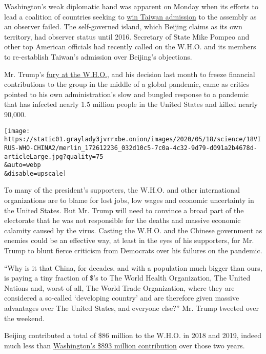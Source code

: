 Washington's weak diplomatic hand was apparent on Monday when its
efforts to lead a coalition of countries seeking to
\href{https://www.nytimes3xbfgragh.onion/aponline/2020/05/18/world/asia/ap-as-taiwan-world-health-assembly.html}{win
Taiwan admission} to the assembly as an observer failed. The
self-governed island, which Beijing claims as its own territory, had
observer status until 2016. Secretary of State Mike Pompeo and other top
American officials had recently called on the W.H.O. and its members to
re-establish Taiwan's admission over Beijing's objections.

Mr. Trump's
\href{https://www.nytimes3xbfgragh.onion/2020/04/14/us/politics/coronavirus-trump-who-funding.html}{fury
at the W.H.O.}, and his decision last month to freeze financial
contributions to the group in the middle of a global pandemic, came as
critics pointed to his own administration's slow and bungled response to
a pandemic that has infected nearly 1.5 million people in the United
States and killed nearly 90,000.

\texttt{[image: https://static01.graylady3jvrrxbe.onion/images/2020/05/18/science/18VIRUS-WHO-CHINA2/merlin\_172612236\_032d10c5-7c0a-4c32-9d79-d091a2b4678d-articleLarge.jpg?quality=75\\\&auto=webp\\\&disable=upscale]}

To many of the president's supporters, the W.H.O. and other
international organizations are to blame for lost jobs, low wages and
economic uncertainty in the United States. But Mr. Trump will need to
convince a broad part of the electorate that he was not responsible for
the deaths and massive economic calamity caused by the virus. Casting
the W.H.O. and the Chinese government as enemies could be an effective
way, at least in the eyes of his supporters, for Mr. Trump to blunt
fierce criticism from Democrats over his failures on the pandemic.

``Why is it that China, for decades, and with a population much bigger
than ours, is paying a tiny fraction of \$'s to The World Health
Organization, The United Nations and, worst of all, The World Trade
Organization, where they are considered a so-called `developing country'
and are therefore given massive advantages over The United States, and
everyone else?'' Mr. Trump tweeted over the weekend.

Beijing contributed a total of \$86 million to the W.H.O. in 2018 and
2019, indeed much less than
\href{http://open.who.int/2018-19/contributors/contributor?name=United\%20States\%20of\%20America}{Washington's
\$893 million contribution} over those two years.


